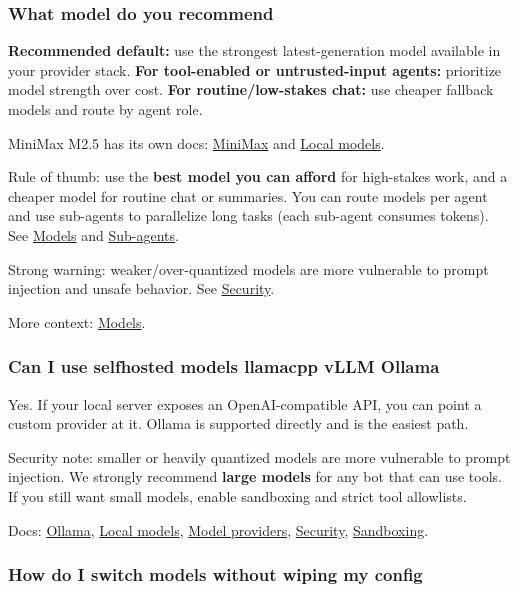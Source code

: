 \subsubsection{What model do you recommend}


\textbf{Recommended default:} use the strongest latest-generation model available in your provider stack.
\textbf{For tool-enabled or untrusted-input agents:} prioritize model strength over cost.
\textbf{For routine/low-stakes chat:} use cheaper fallback models and route by agent role.

MiniMax M2.5 has its own docs: \href{/providers/minimax}{MiniMax} and
\href{/gateway/local-models}{Local models}.

Rule of thumb: use the \textbf{best model you can afford} for high-stakes work, and a cheaper
model for routine chat or summaries. You can route models per agent and use sub-agents to
parallelize long tasks (each sub-agent consumes tokens). See \href{/concepts/models}{Models} and
\href{/tools/subagents}{Sub-agents}.

Strong warning: weaker/over-quantized models are more vulnerable to prompt
injection and unsafe behavior. See \href{/gateway/security}{Security}.

More context: \href{/concepts/models}{Models}.

\subsubsection{Can I use selfhosted models llamacpp vLLM Ollama}


Yes. If your local server exposes an OpenAI-compatible API, you can point a
custom provider at it. Ollama is supported directly and is the easiest path.

Security note: smaller or heavily quantized models are more vulnerable to prompt
injection. We strongly recommend \textbf{large models} for any bot that can use tools.
If you still want small models, enable sandboxing and strict tool allowlists.

Docs: \href{/providers/ollama}{Ollama}, \href{/gateway/local-models}{Local models},
\href{/concepts/model-providers}{Model providers}, \href{/gateway/security}{Security},
\href{/gateway/sandboxing}{Sandboxing}.

\subsubsection{How do I switch models without wiping my config}


